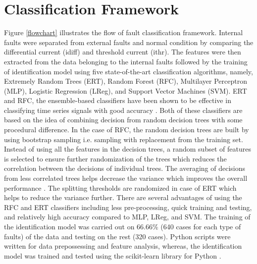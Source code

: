 \documentclass[conference]{IEEEtran}
\begin{document}
\section{Classification Framework} Figure \ref{flowchart} illustrates the flow of fault classification framework. Internal faults were separated from external faults and normal condition by comparing the differential current (idiff) and threshold current (ithr). The features were then extracted from the data belonging to the internal faults followed by the training of identification model using five state-of-the-art classification algorithms, namely, Extremely Random Trees (ERT), Random Forest (RFC), Multilayer Perceptron (MLP), Logistic Regression (LReg), and Support Vector Machines (SVM). ERT and RFC, the ensemble-based classifiers have been shown to be effective in classifying time series signals with good accuracy \cite{KumarTimeSeries,KumarISBA}. Both of these classifiers are based on the idea of combining decision from random decision trees with some procedural difference. In the case of RFC, the random decision trees are built by using bootstrap sampling i.e. sampling with replacement from the training set. Instead of using all the features in the decision trees, a random subset of features is selected to ensure further randomization of the trees which reduces the correlation between the decisions of individual trees. The averaging of decisions from less correlated trees helps decrease the variance which improves the overall performance \cite{RFCERT}. The splitting thresholds are randomized in case of ERT which helps to reduce the variance further. There are several advantages of using the RFC and ERT classifiers including less pre-processing, quick training and testing, and relatively high accuracy compared to MLP, LReg, and SVM. The training of the identification model was carried out on 66.66\%  (640 cases for each type of faults) of the data and testing on the rest (320 cases). Python scripts were written for data prepossessing and feature analysis, whereas, the identification model was trained and tested using the scikit-learn library for Python \cite{scikit-learn}.
\end{document}
